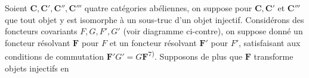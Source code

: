 
Soient $\mathbf C,\mathbf C',\mathbf C'',\mathbf C'''$ quatre catégories abéliennes, on suppose pour
$\mathbf C,\mathbf C'$ et $\mathbf C'''$ que tout objet y est isomorphe à un sous-truc d'un objet injectif.
Considérons des foncteurs covariants $F,G,F',G'$ (voir diagramme ci-contre),
on suppose donné un foncteur résolvant $\mathbf F$ pour $F$ et un foncteur
résolvant $\mathbf F'$ pour $F'$, satisfaisant aux conditions de commutation
$\mathbf F'G'=G\mathbf F$\textsuperscript{7)}. Supposons de plus que $\mathbf F$ transforme
objets injectifs en

